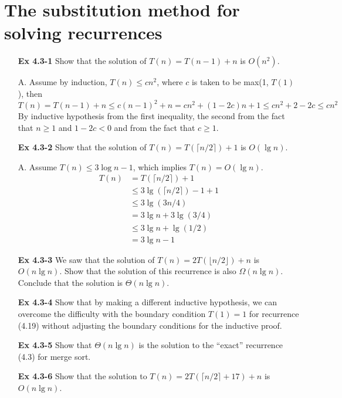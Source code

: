 \documentclass[fontsize=12pt,paper=a4]{book}
\begin{document}
\section{The substitution method for solving recurrences}
\begin{enumerate}
	\item[\textbf{Ex 4.3-1}]
		Show that the solution of $T(n) = T(n-1)+n$ is $O(n^2)$.
	\item[A.]
	Assume by induction, $T(n) \leq cn^2$, where $c$ is taken to be max(1, $T(1)$), then
	\[ T(n) = T(n-1) + n \leq c(n-1)^2 + n = cn^2 + (1-2c)n + 1 \leq cn^2 + 2 - 2c \leq cn^2 \]
By inductive hypothesis from the first inequality, the second from the fact that $n \geq 1$ and $1-2c<0$ and from the fact that $c \geq 1$.

	\item[\textbf{Ex 4.3-2}]
		Show that the solution of $T(n) = T(\lceil n/2 \rceil) + 1$ is $O(\lg n)$.
	\item[A.]
	Assume $T(n) \leq 3\log n - 1$, which implies $T(n) = O(\lg n)$.
	\begin{equation*}
		\begin{split}
			T(n) & = T(\lceil n/2 \rceil) + 1 \\
			& \leq 3 \lg(\lceil n/2 \rceil) -1 + 1 \\
			& \leq 3 \lg(3n/4)\\
			& = 3\lg n + 3\lg(3/4)\\
			& \leq 3\lg n + \lg(1/2)\\
			& = 3\lg n - 1
		\end{split}
	\end{equation*}
	
	\item[\textbf{Ex 4.3-3}]
		We saw that the solution of $T(n) = 2T(\lfloor n/2 \rfloor) + n$ is $O(n \lg n)$. Show that the solution of this recurrence is also $\Omega(n \lg n)$. Conclude that the solution is $\Theta(n \lg n)$.
		
	\item[\textbf{Ex 4.3-4}]
		Show that by making a different inductive hypothesis, we can overcome the difficulty with the boundary condition $T(1) = 1$ for recurrence (4.19) without adjusting the boundary conditions for the inductive proof.
		
	\item[\textbf{Ex 4.3-5}]
		Show that $\Theta(n \lg n)$ is the solution to the “exact” recurrence (4.3) for merge sort.
		
	\item[\textbf{Ex 4.3-6}]
		Show that the solution to $T(n) = 2T(\lceil n/2 \rceil + 17) + n$ is $O(n \lg n)$.
		

\end{enumerate}
\end{document}
